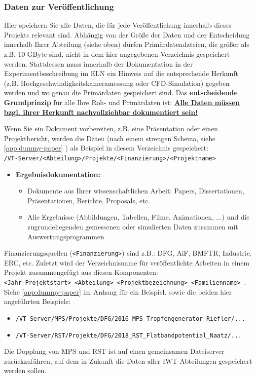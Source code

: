 \subsubsection{Daten zur Veröffentlichung}\label{ssc:data-for-publication}

Hier speichern Sie alle Daten, die für jede Veröffentlichung innerhalb dieses
Projekts relevant sind. Abhängig von der Größe der Daten und der Entscheidung
innerhalb Ihrer Abteilung (siehe oben) dürfen Primärdatendateien, die größer als
z.B. 10 GByte sind, nicht in dem hier angegebenen Verzeichnis gespeichert
werden. Stattdessen muss innerhalb der Dokumentation in der
Experimentbeschreibung im ELN ein Hinweis auf die entsprechende Herkunft (z.B.
Hochgeschwindigkeitskameramessung oder CFD-Simulation) gegeben werden und wo
genau die Primärdaten gespeichert sind. Das \textbf{entscheidende Grundprinzip}
für alle Ihre Roh- und Primärdaten ist: \textbf{\underline{Alle Daten müssen bzgl.
ihrer Herkunft nachvollziehbar dokumentiert sein!}}

Wenn Sie ein Dokument vorbereiten, z.B. eine Präsentation oder einen
Projektbericht, werden die Daten (nach einem strengen Schema, siehe \ref{app:dummy-paper} ) als Beispiel in diesem Verzeichnis gespeichert: \\
\texttt{/VT-Server/<Abteilung>/Projekte/<Finanzierung>/<Projektname>}
\begin{itemize}
  \item[$\rightarrow$] \textbf{Ergebnisdokumentation:}
    \begin{itemize}
      \item Dokumente aus Ihrer wissenschaftlichen Arbeit: Papers,
            Dissertationen, Präsentationen, Berichte, Proposals, etc.
      \item Alle Ergebnisse (Abbildungen, Tabellen, Filme, Animationen, ...)
            und die zugrundeliegenden gemessenen oder simulierten Daten
            zusammen mit Auswertungsprogrammen
    \end{itemize}
\end{itemize}
Finanzierungsquellen (\texttt{<Finanzierung>}) sind z.B.: DFG, AiF, BMFTR, Industrie, ERC, etc. Zuletzt wird der Verzeichnisname für veröffentlichte Arbeiten in einem Projekt zusammengefügt aus diesen Komponenten: \\
\texttt{<Jahr Projektstart>\_<Abteilung>\_<Projektbezeichnung>\_<Familienname> }.
Siehe \ref{app:dummy-paper} im Anhang für ein Beispiel.
sowie die beiden hier angeführten Beispiele:
\begin{itemize}
   \item \texttt{/VT-Server/MPS/Projekte/DFG/2016\_MPS\_Tropfengenerator\_Riefler/...}
   \item \texttt{/VT-Server/RST/Projekte/DFG/2018\_RST\_Flatbandpotential\_Naatz/...}
\end{itemize}
Die Dopplung von MPS und RST ist auf einen gemeinsamen Dateiserver zurückzuführen, auf dem in Zukunft die Daten aller IWT-Abteilungen gespeichert werden sollen.

